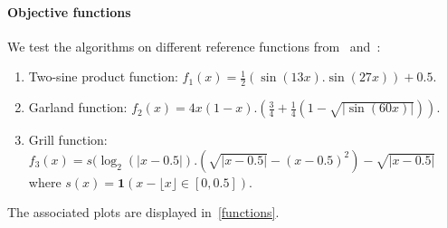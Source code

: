 \documentclass[a4paper,10pt]{article}
\begin{document}
\paragraph{Objective functions}
We test the algorithms on different reference functions from~\cite{valko2013stochastic} and~\cite{grill2015black}:
\begin{enumerate}
\item Two-sine product function: $f_1(x) = \frac{1}{2} (\sin(13x) . \sin(27x))+0.5$.
\item Garland function: $f_2(x) = 4x(1-x).(\frac{3}{4}+\frac{1}{4}(1-\sqrt{|\sin(60x)|}))$.
\item Grill function: $f_3(x) = s(\log_2(|x-0.5|).(\sqrt{|x-0.5|}-(x-0.5)^2)-\sqrt{|x-0.5|}$ where $s(x)=\mathbf{1}(x- \lfloor x \rfloor \in [0,0.5])$.
\end{enumerate}
The associated plots are displayed in~\ref{functions}.
\end{document}

